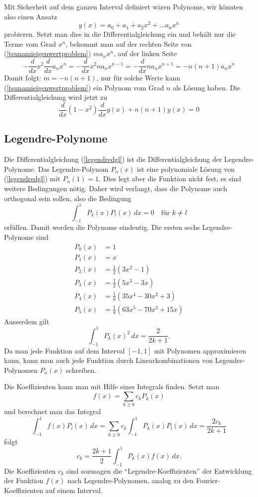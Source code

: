 Mit Sicherheit auf dem ganzen Interval definiert wären Polynome,
wir könnten also einen Ansatz
\[
y(x)=a_0+a_1+a_2x^2+\dots a_nx^n
\]
probieren. Setzt man dies in die Differentialgleichung ein und
behält nur die Terme vom Grad $x^n$, bekommt man auf der rechten
Seite von (\ref{tsunamieigenwertproblem}) $ma_nx^n$, auf
der linken Seite
\[
-\frac{d}{dx}x^2\frac{d}{dx}a_nx^n
=
-\frac{d}{dx}x^2na_nx^{n-1}
=
-\frac{d}{dx}na_nx^{n+1}
=
-n(n+1)a_nx^n
\]
Damit folgt: $m=-n(n+1)$, nur für solche Werte kann
(\ref{tsunamieigenwertproblem}) ein Polynom vom Grad $n$ als Lösung
haben. Die Differentialgleichung wird jetzt zu
\begin{equation}
\frac{d}{dx}(1-x^2)\frac{d}{dx}y(x)+n(n+1)y(x)=0
\label{legendredgl}
\end{equation}

\subsection{Legendre-Polynome}
Die Differentialgleichung (\ref{legendredgl}) ist die Differentialgleichung
der Legendre-Polynome.
Das Legendre-Polynom $P_n(x)$ ist eine polynomiale Lösung von
(\ref{legendredgl}) mit $P_n(1)=1$.
Dies legt aber die Funktion nicht fest, es sind weitere Bedingungen
nötig. Daher wird verlangt, dass die Polynome auch orthogonal
sein sollen, also die Bedingung
\[
\int_{-1}^1 P_k(x)P_l(x)\,dx=0\quad\text{für $k\ne l$}
\]
erfüllen. Damit werden die Polynome eindeutig.
Die ersten sechs Legendre-Polynome sind
\begin{align*}
P_0(x)&=1\\
P_1(x)&=x\\
P_2(x)&=\frac12(3x^2-1)\\
P_3(x)&=\frac12(5x^3-3x)\\
P_4(x)&=\frac18(35x^4-30x^2+3)\\
P_5(x)&=\frac18(63x^5-70x^3+15x)
\end{align*}
Ausserdem gilt
\[
\int_{-1}^1 P_k(x)^2\,dx = \frac{2}{2k+1}.
\]
Da man 
jede Funktion auf dem Interval $[-1,1]$ mit Polynomen approximieren kann,
kann man auch jede Funktion durch Linearkombinationen von Legendre-Polynomen
$P_n(x)$ schreiben. 

Die Koeffizienten kann man mit Hilfe eines Integrals finden. Setzt man
\[
f(x)=\sum_{k\ge 0} c_k P_k(x)
\]
und berechnet man das Integral
\[
\int_{-1}^1 f(x)P_l(x)\,dx
=
\sum_{k\ge 0} c_k \int_{-1}^1 P_k(x)P_l(x)\,dx
=
\frac{2c_k}{2k+1}
\]
folgt
\[
c_k=\frac{2k+1}{2}\int_{-1}^1P_k(x)f(x)\,dx.
\]
Die Koeffizienten $c_k$ sind sozusagen die ``Legendre-Koeffizienten''
der Entwicklung der Funktion $f(x)$ nach Legendre-Polynomen,
analog zu den Fourier-Koeffizienten auf einem Interval.


